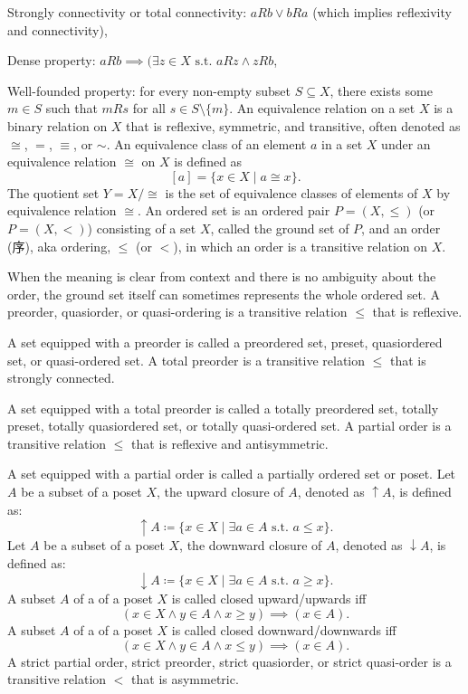 \documentclass[a4paper,12pt]{article}
\begin{document}
\item Strongly connectivity or total connectivity: $aRb\lor bRa$ (which implies reflexivity and connectivity),
\item Dense property: $aRb\implies (\exists z\in X\text{\ s.t.\ }aRz\land zRb$,
\item Well-founded property: for every non-empty subset $S\subseteq X$, there exists some $m\in S$ such that $mRs$ for all $s\in S\setminus\{m\}$.
\eit
{}
An equivalence relation on a set $X$ is a binary relation on $X$ that is reflexive, symmetric, and transitive, often denoted as $\cong$, $=$, $\equiv$, or $\sim$.
An equivalence class of an element $a$ in a set $X$ under an equivalence relation $\cong$ on $X$ is defined as
\[[a]=\{x\in X\mid a\cong x\}.\]
The quotient set $Y=X/\cong$ is the set of equivalence classes of elements of $X$ by equivalence relation $\cong$. 
An ordered set is an ordered pair $P=(X,\leq )$ (or $P=(X,<)$) consisting of a set $X$, called the ground set of $P$, and an order (序), aka ordering, $\leq$ (or $<$), in which an order is a transitive relation on $X$.

When the meaning is clear from context and there is no ambiguity about the order, the ground set itself can sometimes represents the whole ordered set.
A preorder, quasiorder, or quasi-ordering is a transitive relation $\leq$ that is reflexive. 

A set equipped with a preorder is called a preordered set, preset, quasiordered set, or quasi-ordered set.
A total preorder is a transitive relation $\leq$ that is strongly connected.

A set equipped with a total preorder is called a totally preordered set, totally preset, totally quasiordered set, or totally quasi-ordered set.
A partial order is a transitive relation $\leq$ that is reflexive and antisymmetric.

A set equipped with a partial order is called a partially ordered set or poset.
Let $A$ be a subset of a poset $X$, the upward closure of $A$, denoted as $\uparrow A$, is defined as:
\[\uparrow A \coloneq \{ x \in X \mid\exists a \in A \text{\ s.t.\ } a \leq x \}.\]
Let $A$ be a subset of a poset $X$, the downward closure of $A$, denoted as $\downarrow A$, is defined as:
\[\downarrow A \coloneq \{ x \in X \mid\exists a \in A \text{\ s.t.\ } a \geq x \}.\]
A subset $A$ of a of a poset $X$ is called closed upward/upwards iff
\[(x\in X\land y\in A\land x\geq y)\implies (x\in A).\]
A subset $A$ of a of a poset $X$ is called closed downward/downwards iff
\[(x\in X\land y\in A\land x\leq y)\implies (x\in A).\]
A strict partial order, strict preorder, strict quasiorder, or strict quasi-order is a transitive relation $<$ that is asymmetric.
\end{document}
